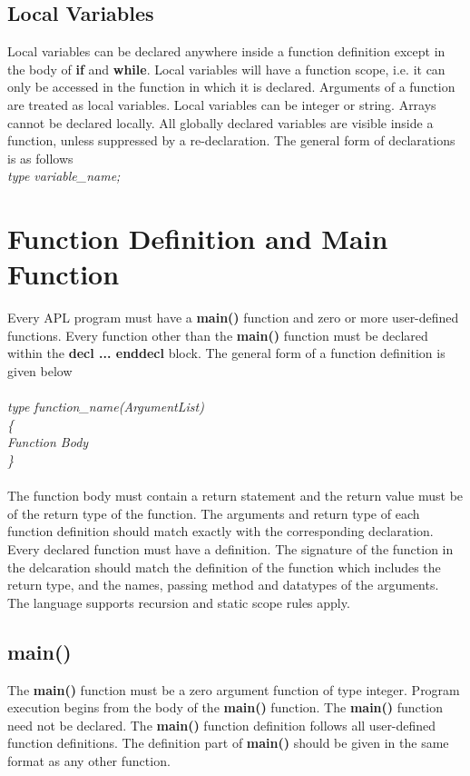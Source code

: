 \documentclass[11pt]{article}
\begin{document}
\subsection{Local Variables}
Local variables can be declared anywhere inside a function definition except in the body of \textbf{if} and \textbf{while}. Local variables will have a function scope, i.e. it can only be accessed in the function in which it is declared. Arguments of a function are treated as local variables. Local variables can be integer or string. Arrays cannot be declared locally. All globally declared variables are visible inside a function, unless suppressed by a re-declaration. The general form of declarations is as follows \\

\textit{type variable\_name;} 






\section{Function Definition and Main Function}

Every APL program must have a \textbf{main()} function and zero or more user-defined functions. Every function other than the \textbf{main()} function must be declared within the \textbf{decl ... enddecl} block. The general form of a function definition is given below 
\\
\\
\textit{
type function\_name(ArgumentList) \\ \{ \\
  Function Body \\
\}
}
\\
\\
The function body must contain a return statement and the return value must be of the return type of the function. The arguments and return type of each function definition should match exactly with the corresponding declaration. Every declared function must have a definition. The signature of the function in the delcaration should match the definition of the function which includes the return type, and the names, passing method and datatypes of the arguments. The language supports recursion and static scope rules apply.




\subsection{main()}
The \textbf{main()} function must be a zero argument function of type integer. Program execution begins from the body of the \textbf{main()} function. The \textbf{main()} function need not be declared. The \textbf{main()} function definition follows all user-defined function definitions.  The definition part of \textbf{main()} should be given in the same format as any other function.
\end{document}
